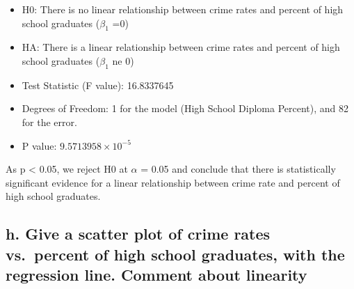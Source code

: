 \documentclass[
]{article}
\begin{document}
\begin{itemize}
\item
  H0: There is no linear relationship between crime rates and percent of
  high school graduates (\(\beta_1\) =0)
\item
  HA: There is a linear relationship between crime rates and percent of
  high school graduates (\(\beta_1\) ne 0)
\item
  Test Statistic (F value): 16.8337645
\item
  Degrees of Freedom: 1 for the model (High School Diploma Percent), and
  82 for the error.
\item
  P value: \ensuremath{9.5713958\times 10^{-5}}
\end{itemize}

As p \textless{} 0.05, we reject H0 at \(\alpha\) = 0.05 and conclude
that there is statistically significant evidence for a linear
relationship between crime rate and percent of high school graduates.

\hypertarget{h.-give-a-scatter-plot-of-crime-rates-vs.-percent-of-high-school-graduates-with-the-regression-line.-comment-about-linearity}{%
\subsection{h. Give a scatter plot of crime rates vs.~percent of high
school graduates, with the regression line. Comment about
linearity}\label{h.-give-a-scatter-plot-of-crime-rates-vs.-percent-of-high-school-graduates-with-the-regression-line.-comment-about-linearity}}
\end{document}
